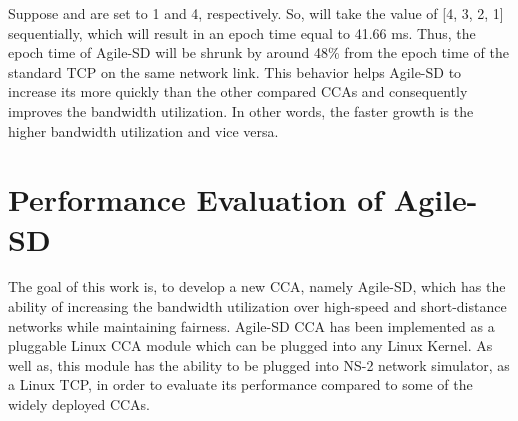 \documentclass[preprint,3p,times,twocolumn,authoryear]{elsarticle}
\begin{document}
Suppose  and  are set to 1 and 4, respectively. So,  will take the value of [4, 3, 2, 1] sequentially, which will result in an epoch time equal to 41.66 ms. Thus, the epoch time of Agile-SD will be shrunk by around 48\% from the epoch time of the standard TCP on the same network link. This behavior helps Agile-SD to increase its  more quickly than the other compared CCAs and consequently improves the bandwidth utilization. In other words, the faster  growth is the higher bandwidth utilization and vice versa. 

\section{Performance Evaluation of Agile-SD}
\label{PE}
The goal of this work is, to develop a new CCA, namely Agile-SD, which has the ability of increasing the bandwidth utilization over high-speed and short-distance networks while maintaining fairness. \mbox{Agile-SD} CCA has been implemented as a pluggable Linux CCA module which can be plugged into any Linux Kernel. As well as, this module has the ability to be plugged into NS-2 network simulator, as a Linux TCP, in order to evaluate its performance compared to some of the widely deployed CCAs.
\end{document}
